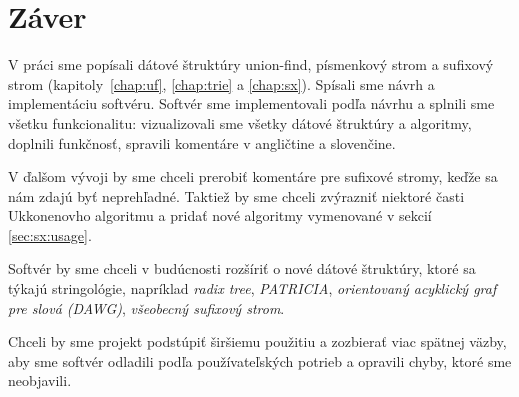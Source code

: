 \cleardoublepage
{}
{}
\chapter*{Záver}\label{chap:zaver}

V práci sme popísali dátové štruktúry union-find, písmenkový strom a sufixový 
strom (kapitoly~\ref{chap:uf}, \ref{chap:trie} a \ref{chap:sx}). Spísali sme 
návrh a implementáciu softvéru. Softvér sme implementovali 
podľa návrhu a splnili sme všetku funkcionalitu: vizualizovali sme všetky 
dátové štruktúry a algoritmy, doplnili funkčnosť, spravili komentáre v 
angličtine a slovenčine.

V ďalšom vývoji by sme chceli prerobiť komentáre pre sufixové stromy, keďže sa 
nám zdajú byť neprehľadné. Taktiež by sme chceli zvýrazniť niektoré časti 
Ukkonenovho algoritmu a pridať nové algoritmy vymenované v sekcií 
\ref{sec:sx:usage}.

Softvér by sme chceli v budúcnosti rozšíriť o nové dátové štruktúry, ktoré sa 
týkajú stringológie, napríklad \emph{radix tree}, \emph{PATRICIA}, 
\emph{orientovaný acyklický graf pre slová (DAWG)}, \emph{všeobecný sufixový 
strom}.

Chceli by sme projekt podstúpiť širšiemu použitiu a zozbierať viac spätnej 
väzby, aby sme softvér odladili podľa používateľských potrieb a opravili 
chyby, ktoré sme neobjavili. 


\cleardoublepage
{}
{}

\printbibliography

\backmatter
